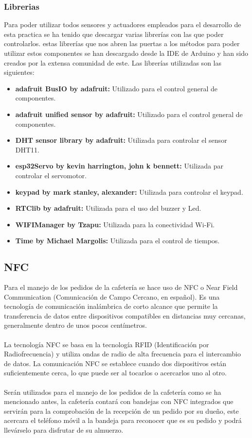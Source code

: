 \documentclass[12pt]{report}
\begin{document}
\subsubsection{Librerias}
Para poder utilizar todos sensores y actuadores empleados para el desarrollo de esta practica se ha tenido que descargar varias librerías con las que poder controlarlos. estas librerías que nos abren las puertas a los métodos para poder utilizar estos componentes se han descargado desde la IDE de Arduino y han sido creados por la extensa comunidad de este. Las librerías utilizadas son las siguientes:
\begin{itemize}
    \item \textbf{adafruit BusIO by adafruit:} Utilizado para el control general de componentes.
    \item \textbf{adafruit unified sensor by adafruit:} Utilizado para el control general de componentes.
    \item \textbf{DHT sensor library by adafruit:} Utilizada para controlar el sensor DHT11.
    \item \textbf{esp32Servo by kevin harrington, john k bennett:} Utilizada par controlar el servomotor.
    \item \textbf{keypad by mark stanley, alexander:} Utilizada para controlar el keypad.
    \item \textbf{RTClib by adafruit:} Utilizada para el uso del buzzer y Led.
    \item \textbf{WIFIManager by Tzapu:} Utilizada para la conectividad Wi-Fi.
    \item \textbf{Time by Michael Margolis:} Utilizada para el control de tiempos.
\end{itemize}
\subsection{NFC}
Para el manejo de los pedidos de la cafetería se hace uso de NFC o Near Field Communication (Comunicación de Campo Cercano, en español). Es una tecnología de comunicación inalámbrica de corto alcance que permite la transferencia de datos entre dispositivos compatibles en distancias muy cercanas, generalmente dentro de unos pocos centímetros.
\\\\
La tecnología NFC se basa en la tecnología RFID (Identificación por Radiofrecuencia) y utiliza ondas de radio de alta frecuencia para el intercambio de datos. La comunicación NFC se establece cuando dos dispositivos están suficientemente cerca, lo que puede ser al tocarlos o acercarlos uno al otro.
\\\\
Serán utilizados para el manejo de los pedidos de la cafetería como se ha mencionado antes, la cafetería contará con bandejas con NFC integrados que servirán para la comprobación de la recepción de un pedido por su dueño, este acercara el teléfono móvil a la bandeja para reconocer que es su pedido y podrá llevárselo para disfrutar de su almuerzo.
\end{document}
